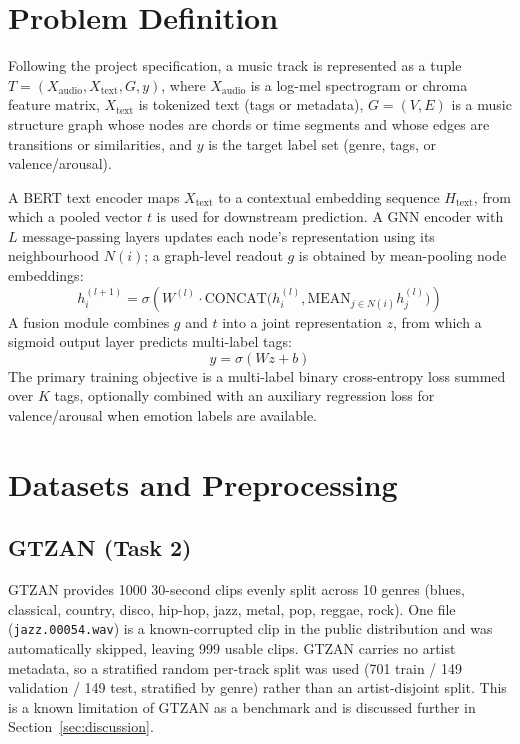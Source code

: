 \documentclass[conference]{IEEEtran}
\begin{document}
\section{Problem Definition}
Following the project specification, a music track is represented as a tuple $T = (X_{\text{audio}}, X_{\text{text}}, G, y)$, where $X_{\text{audio}}$ is a log-mel spectrogram or chroma feature matrix, $X_{\text{text}}$ is tokenized text (tags or metadata), $G = (V, E)$ is a music structure graph whose nodes are chords or time segments and whose edges are transitions or similarities, and $y$ is the target label set (genre, tags, or valence/arousal).

A BERT text encoder maps $X_{\text{text}}$ to a contextual embedding sequence $H_{\text{text}}$, from which a pooled vector $t$ is used for downstream prediction. A GNN encoder with $L$ message-passing layers updates each node's representation using its neighbourhood $N(i)$; a graph-level readout $g$ is obtained by mean-pooling node embeddings:
\begin{equation}
h_i^{(l+1)} = \sigma\!\left(W^{(l)} \cdot \text{CONCAT}\big(h_i^{(l)}, \text{MEAN}_{j \in N(i)} h_j^{(l)}\big)\right)
\end{equation}
A fusion module combines $g$ and $t$ into a joint representation $z$, from which a sigmoid output layer predicts multi-label tags:
\begin{equation}
\hat{y} = \sigma(Wz + b)
\end{equation}
The primary training objective is a multi-label binary cross-entropy loss summed over $K$ tags, optionally combined with an auxiliary regression loss for valence/arousal when emotion labels are available.

\section{Datasets and Preprocessing}

\subsection{GTZAN (Task 2)}
GTZAN provides 1000 30-second clips evenly split across 10 genres (blues, classical, country, disco, hip-hop, jazz, metal, pop, reggae, rock). One file (\texttt{jazz.00054.wav}) is a known-corrupted clip in the public distribution and was automatically skipped, leaving 999 usable clips. GTZAN carries no artist metadata, so a stratified random per-track split was used (701 train / 149 validation / 149 test, stratified by genre) rather than an artist-disjoint split. This is a known limitation of GTZAN as a benchmark and is discussed further in Section~\ref{sec:discussion}.
\end{document}
